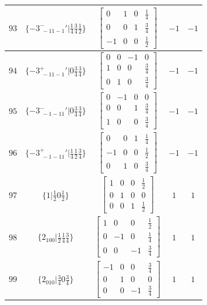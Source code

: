 \documentclass[fleqn,8pt]{jsarticle}
\begin{document}
\begin{longtable}{ccccc}
$ 93 $ & $ \{-3^{-}_{\,\,-11-1}{}'|\frac{1}{4} \frac{3}{4} \frac{1}{2}\} $ & $ \begin{bmatrix} 0 & 1 & 0 & \frac{1}{4} \\ 0 & 0 & 1 & \frac{3}{4} \\ -1 & 0 & 0 & \frac{1}{2} \end{bmatrix} $ & $ -1 $ & $ -1 $ \\ \hline
$ 94 $ & $ \{-3^{+}_{\,\,-11-1}{}'|0 \frac{3}{4} \frac{3}{4}\} $ & $ \begin{bmatrix} 0 & 0 & -1 & 0 \\ 1 & 0 & 0 & \frac{3}{4} \\ 0 & 1 & 0 & \frac{3}{4} \end{bmatrix} $ & $ -1 $ & $ -1 $ \\ \hline
$ 95 $ & $ \{-3^{-}_{\,\,-1-11}{}'|0 \frac{3}{4} \frac{3}{4}\} $ & $ \begin{bmatrix} 0 & -1 & 0 & 0 \\ 0 & 0 & 1 & \frac{3}{4} \\ 1 & 0 & 0 & \frac{3}{4} \end{bmatrix} $ & $ -1 $ & $ -1 $ \\ \hline
$ 96 $ & $ \{-3^{+}_{\,\,-1-11}{}'|\frac{1}{4} \frac{1}{2} \frac{3}{4}\} $ & $ \begin{bmatrix} 0 & 0 & 1 & \frac{1}{4} \\ -1 & 0 & 0 & \frac{1}{2} \\ 0 & 1 & 0 & \frac{3}{4} \end{bmatrix} $ & $ -1 $ & $ -1 $ \\ \hline
$ 97 $ & $ \{1|\frac{1}{2} 0 \frac{1}{2}\} $ & $ \begin{bmatrix} 1 & 0 & 0 & \frac{1}{2} \\ 0 & 1 & 0 & 0 \\ 0 & 0 & 1 & \frac{1}{2} \end{bmatrix} $ & $ 1 $ & $ 1 $ \\ \hline
$ 98 $ & $ \{2{}_{100}|\frac{1}{2} \frac{1}{4} \frac{3}{4}\} $ & $ \begin{bmatrix} 1 & 0 & 0 & \frac{1}{2} \\ 0 & -1 & 0 & \frac{1}{4} \\ 0 & 0 & -1 & \frac{3}{4} \end{bmatrix} $ & $ 1 $ & $ 1 $ \\ \hline
$ 99 $ & $ \{2{}_{010}|\frac{3}{4} 0 \frac{3}{4}\} $ & $ \begin{bmatrix} -1 & 0 & 0 & \frac{3}{4} \\ 0 & 1 & 0 & 0 \\ 0 & 0 & -1 & \frac{3}{4} \end{bmatrix} $ & $ 1 $ & $ 1 $ \\ \hline

\end{longtable}
\end{document}
